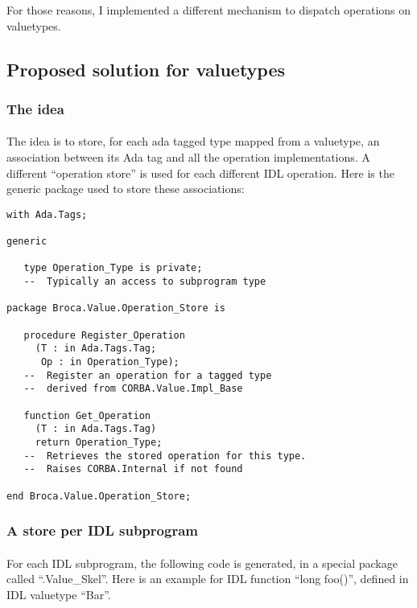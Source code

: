 For those reasons, I implemented a different mechanism to dispatch
operations on valuetypes.

\subsection{Proposed solution for valuetypes}

\subsubsection{The idea}
\paragraph{}The idea is to store, for each ada tagged type mapped from
a valuetype, an association between its Ada tag and all the operation
implementations. A different ``operation store'' is used for each
different IDL operation. Here is the generic package used to store
these associations:

\begin{verbatim}
with Ada.Tags;

generic

   type Operation_Type is private;
   --  Typically an access to subprogram type

package Broca.Value.Operation_Store is

   procedure Register_Operation
     (T : in Ada.Tags.Tag;
      Op : in Operation_Type);
   --  Register an operation for a tagged type
   --  derived from CORBA.Value.Impl_Base

   function Get_Operation
     (T : in Ada.Tags.Tag)
     return Operation_Type;
   --  Retrieves the stored operation for this type.
   --  Raises CORBA.Internal if not found

end Broca.Value.Operation_Store;
\end{verbatim}


\subsubsection{A store per IDL subprogram}
\paragraph{}For each IDL subprogram, the following code is generated,
in a special package called ``.Value\_Skel''. Here is an example for
IDL function ``long foo()'', defined in IDL valuetype ``Bar''.


